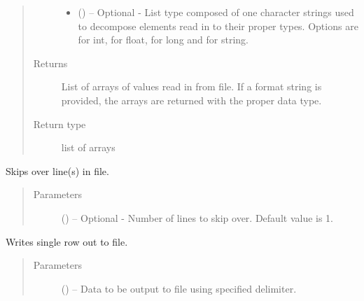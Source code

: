 \documentclass[a4paper,10pt,openany,english]{sphinxmanual}
\begin{document}
\begin{fulllineitems}
\begin{fulllineitems}
\begin{quote}
\begin{description}
\begin{itemize}
\item {} 
 () -- Optional - List type composed of one character strings used to decompose elements
read in to their proper types. Options are  for int,  for float,
 for long and  for string.

\end{itemize}

\item[{Returns}] \leavevmode
List of arrays of values read in from file. If a format string is provided,
the arrays are returned with the proper data type.

\item[{Return type}] \leavevmode
list of arrays

\end{description}\end{quote}

\end{fulllineitems}


\begin{fulllineitems}
\label{egadsapi:egads.input.text_file_io.EgadsCsv.skip_line}
Skips over line(s) in file.
\begin{quote}\begin{description}
\item[{Parameters}] \leavevmode
{} () -- Optional - Number of lines to skip over. Default value is 1.

\end{description}\end{quote}

\end{fulllineitems}


\begin{fulllineitems}
\label{egadsapi:egads.input.text_file_io.EgadsCsv.write}
Writes single row out to file.
\begin{quote}\begin{description}
\item[{Parameters}] \leavevmode
{} () -- Data to be output to file using specified delimiter.


\end{description}
\end{quote}
\end{fulllineitems}
\end{fulllineitems}
\end{document}
